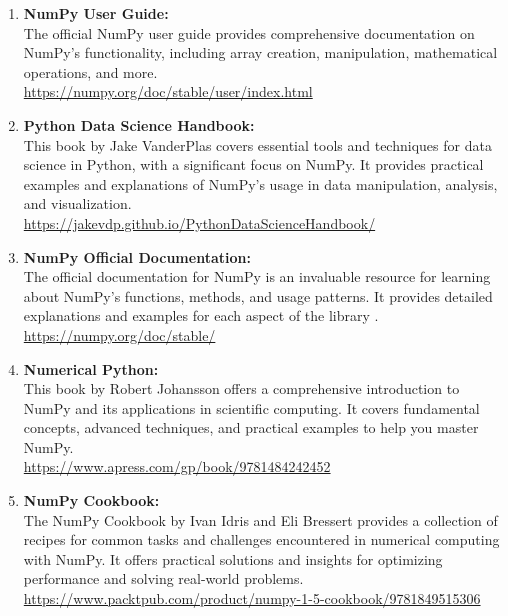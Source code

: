 \begin{enumerate}
	\item \textbf{NumPy User Guide:} \\ The official NumPy user guide provides
	comprehensive documentation on NumPy's functionality, including array creation,
	manipulation, mathematical operations, and more. \\ \url{https://numpy.org/doc/stable/user/index.html}
	
	\item \textbf{Python Data Science Handbook:} \\ This book by Jake VanderPlas
	covers essential tools and techniques for data science in Python, with a significant
	focus on NumPy. It provides practical examples and explanations of NumPy's
	usage in data manipulation, analysis, and visualization. \\ \url{https://jakevdp.github.io/PythonDataScienceHandbook/}
	
	\item \textbf{NumPy Official Documentation:} \\ The official documentation for
	NumPy is an invaluable resource for learning about NumPy's functions, methods,
	and usage patterns. It provides detailed explanations and examples for each aspect
	of the library \cite{NumPy:2024}. \\ \url{https://numpy.org/doc/stable/}
	
	\item \textbf{Numerical Python:} \\ This book by Robert Johansson offers a
	comprehensive introduction to NumPy and its applications in scientific
	computing. It covers fundamental concepts, advanced techniques, and practical
	examples to help you master NumPy. \\
	\url{https://www.apress.com/gp/book/9781484242452}
	
	\item \textbf{NumPy Cookbook:} \\ The NumPy Cookbook by Ivan Idris and Eli
	Bressert provides a collection of recipes for common tasks and challenges
	encountered in numerical computing with NumPy. It offers practical solutions
	and insights for optimizing performance and solving real-world problems. \\
	\url{https://www.packtpub.com/product/numpy-1-5-cookbook/9781849515306}
\end{enumerate}